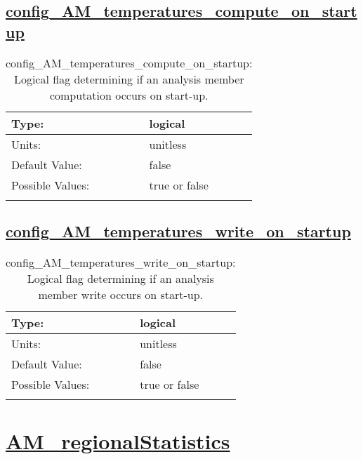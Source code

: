 \subsection[config\_AM\_temperatures\_compute\_on\_startup]{\hyperref[sec:nm_tab_AM_temperatures]{config\_AM\_temperatures\_compute\_on\_startup}}
\label{subsec:nm_sec_config_AM_temperatures_compute_on_startup}
\begin{center}
\begin{longtable}{| p{2.0in} || p{4.0in} |}
    \hline
    Type: & logical \\
    \hline
    Units: & \si{unitless} \\
    \hline
    Default Value: & false \\
    \hline
    Possible Values: & true or false \\
    \hline
    \caption{config\_AM\_temperatures\_compute\_on\_startup: Logical flag determining if an analysis member computation occurs on start-up.}
\end{longtable}
\end{center}
\subsection[config\_AM\_temperatures\_write\_on\_startup]{\hyperref[sec:nm_tab_AM_temperatures]{config\_AM\_temperatures\_write\_on\_startup}}
\label{subsec:nm_sec_config_AM_temperatures_write_on_startup}
\begin{center}
\begin{longtable}{| p{2.0in} || p{4.0in} |}
    \hline
    Type: & logical \\
    \hline
    Units: & \si{unitless} \\
    \hline
    Default Value: & false \\
    \hline
    Possible Values: & true or false \\
    \hline
    \caption{config\_AM\_temperatures\_write\_on\_startup: Logical flag determining if an analysis member write occurs on start-up.}
\end{longtable}
\end{center}
\section[AM\_regionalStatistics]{\hyperref[sec:nm_tab_AM_regionalStatistics]{AM\_regionalStatistics}}
\label{sec:nm_sec_AM_regionalStatistics}
